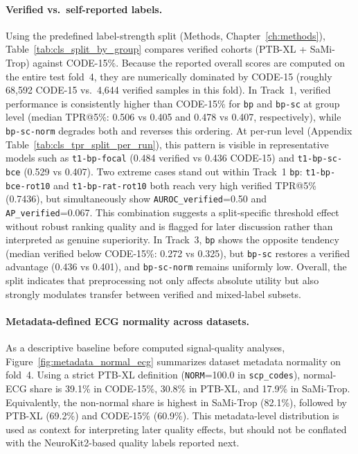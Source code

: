 \paragraph{Verified vs.\ self-reported labels.}
Using the predefined label-strength split (Methods, Chapter~\ref{ch:methods}), Table~\ref{tab:cls_split_by_group} compares verified cohorts (PTB-XL + SaMi-Trop) against CODE-15\%.
Because the reported overall scores are computed on the entire test fold~4, they are numerically dominated by CODE-15 (roughly 68{,}592 CODE-15 vs.\ 4{,}644 verified samples in this fold).
In Track~1, verified performance is consistently higher than CODE-15\% for \texttt{bp} and \texttt{bp-sc} at group level (median TPR@5\%: 0.506 vs 0.405 and 0.478 vs 0.407, respectively), while \texttt{bp-sc-norm} degrades both and reverses this ordering.
At per-run level (Appendix Table~\ref{tab:cls_tpr_split_per_run}), this pattern is visible in representative models such as \texttt{t1-bp-focal} (0.484 verified vs 0.436 CODE-15) and \texttt{t1-bp-sc-bce} (0.529 vs 0.407).
Two extreme cases stand out within Track~1 \texttt{bp}: \texttt{t1-bp-bce-rot10} and \texttt{t1-bp-rat-rot10} both reach very high verified TPR@5\% (0.7436), but simultaneously show \texttt{AUROC\_verified}=0.50 and \texttt{AP\_verified}=0.067.
This combination suggests a split-specific threshold effect without robust ranking quality and is flagged for later discussion rather than interpreted as genuine superiority.
In Track~3, \texttt{bp} shows the opposite tendency (median verified below CODE-15\%: 0.272 vs 0.325), but \texttt{bp-sc} restores a verified advantage (0.436 vs 0.401), and \texttt{bp-sc-norm} remains uniformly low.
Overall, the split indicates that preprocessing not only affects absolute utility but also strongly modulates transfer between verified and mixed-label subsets.




\paragraph{Metadata-defined ECG normality across datasets.}
As a descriptive baseline before computed signal-quality analyses, Figure~\ref{fig:metadata_normal_ecg} summarizes dataset metadata normality on fold~4.
Using a strict PTB-XL definition (\texttt{NORM}=100.0 in \texttt{scp\_codes}), normal-ECG share is 39.1\% in CODE-15\%, 30.8\% in PTB-XL, and 17.9\% in SaMi-Trop.
Equivalently, the non-normal share is highest in SaMi-Trop (82.1\%), followed by PTB-XL (69.2\%) and CODE-15\% (60.9\%).
This metadata-level distribution is used as context for interpreting later quality effects, but should not be conflated with the NeuroKit2-based quality labels reported next.

